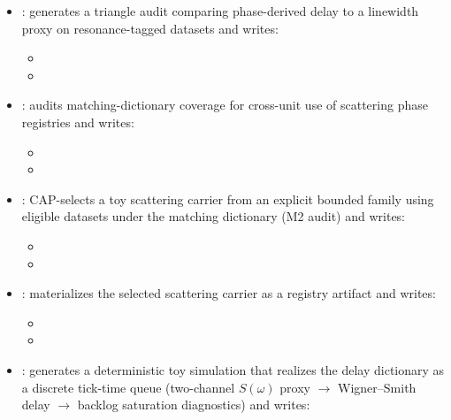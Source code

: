 \begin{sloppypar}
\begin{itemize}
\item {}: generates a triangle audit comparing phase-derived delay to a linewidth proxy on resonance-tagged datasets and writes:
\begin{itemize}
\item {}
\item {}
\end{itemize}
\item {}: audits matching-dictionary coverage for cross-unit use of scattering phase registries and writes:
\begin{itemize}
\item {}
\item {}
\end{itemize}
\item {}: CAP-selects a toy scattering carrier from an explicit bounded family using eligible datasets under the matching dictionary (M2 audit) and writes:
\begin{itemize}
\item {}
\item {}
\end{itemize}
\item {}: materializes the selected scattering carrier as a registry artifact and writes:
\begin{itemize}
\item {}
\item {}
\end{itemize}
\item {}: generates a deterministic toy simulation that realizes the delay dictionary as a discrete tick-time queue (two-channel $S(\omega)$ proxy $\to$ Wigner--Smith delay $\to$ backlog saturation diagnostics) and writes:
\begin{itemize}

\end{itemize}
\end{itemize}
\end{sloppypar}
